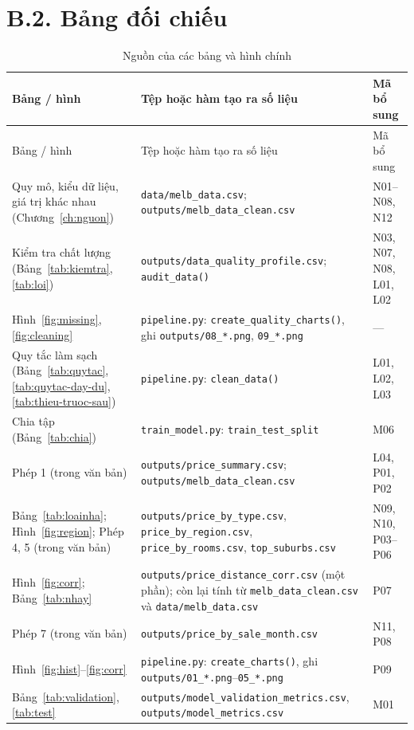 \section*{B.2. Bảng đối chiếu}
\begin{longtable}{@{}L{4.2cm} L{5.8cm} L{4.0cm}@{}}
\caption{Nguồn của các bảng và hình chính}\label{tab:nguon-sl}\\
\toprule
Bảng / hình & Tệp hoặc hàm tạo ra số liệu & Mã bổ sung \\
\midrule
\endfirsthead
\toprule
Bảng / hình & Tệp hoặc hàm tạo ra số liệu & Mã bổ sung \\
\midrule
\endhead
\bottomrule
\endlastfoot
Quy mô, kiểu dữ liệu, giá trị khác nhau (Chương~\ref{ch:nguon}) & \texttt{data/melb\_data.csv}; \texttt{outputs/melb\_data\_clean.csv} & N01--N08, N12 \\
Kiểm tra chất lượng (Bảng~\ref{tab:kiemtra}, \ref{tab:loi}) & \texttt{outputs/data\_quality\_profile.csv}; \texttt{audit\_data()} & N03, N07, N08, L01, L02 \\
Hình~\ref{fig:missing}, \ref{fig:cleaning} & \texttt{pipeline.py}: \texttt{create\_quality\_charts()}, ghi \texttt{outputs/08\_*.png}, \texttt{09\_*.png} & --- \\
Quy tắc làm sạch (Bảng~\ref{tab:quytac}, \ref{tab:quytac-day-du}, \ref{tab:thieu-truoc-sau}) & \texttt{pipeline.py}: \texttt{clean\_data()} & L01, L02, L03 \\
Chia tập (Bảng~\ref{tab:chia}) & \texttt{train\_model.py}: \texttt{train\_test\_split} & M06 \\
Phép 1 (trong văn bản) & \texttt{outputs/price\_summary.csv}; \texttt{outputs/melb\_data\_clean.csv} & L04, P01, P02 \\
Bảng~\ref{tab:loainha}; Hình~\ref{fig:region}; Phép 4, 5 (trong văn bản) & \texttt{outputs/price\_by\_type.csv}, \texttt{price\_by\_region.csv}, \texttt{price\_by\_rooms.csv}, \texttt{top\_suburbs.csv} & N09, N10, P03--P06 \\
Hình~\ref{fig:corr}; Bảng~\ref{tab:nhay} & \texttt{outputs/price\_distance\_corr.csv} (một phần); còn lại tính từ \texttt{melb\_data\_clean.csv} và \texttt{data/melb\_data.csv} & P07 \\
Phép 7 (trong văn bản) & \texttt{outputs/price\_by\_sale\_month.csv} & N11, P08 \\
Hình~\ref{fig:hist}--\ref{fig:corr} & \texttt{pipeline.py}: \texttt{create\_charts()}, ghi \texttt{outputs/01\_*.png}--\texttt{05\_*.png} & P09 \\
Bảng~\ref{tab:validation}, \ref{tab:test} & \texttt{outputs/model\_validation\_metrics.csv}, \texttt{outputs/model\_metrics.csv} & M01 \\

\end{longtable}
